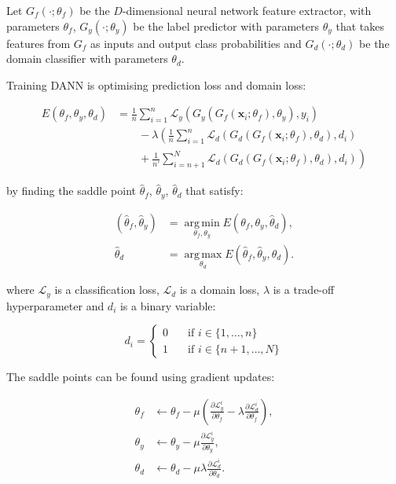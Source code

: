 Let \(G_f(\cdot; \theta_f)\) be the \(D\)-dimensional neural network feature extractor, with parameters \(\theta_f\),
\(G_y(\cdot; \theta_y)\) be the label predictor with parameters \(\theta_y\)
that takes features from \(G_f\) as inputs and output class probabilities
and \(G_d(\cdot; \theta_d)\) be the domain classifier with parameters \(\theta_d\).

Training DANN is optimising prediction loss and domain loss:

\begin{align}
	E(\theta_f, \theta_y, \theta_d) &= \frac{1}{n} \sum^{n}_{i = 1} \mathcal{L}_y(G_y(G_f(\mathbf{x}_i; \theta_f), \theta_y), y_i) \nonumber \\
	&\qquad {} - \lambda \left(\frac{1}{n} \sum^{n}_{i = 1} \mathcal{L}_d(G_d(G_f(\mathbf{x}_i; \theta_f), \theta_d), d_i) \right. \nonumber \\
	&\qquad \left. {} + \frac{1}{n'} \sum^{N}_{i = n + 1} \mathcal{L}_d(G_d(G_f(\mathbf{x}_i; \theta_f), \theta_d), d_i)\right)
\end{align}

by finding the saddle point \(\hat{\theta}_f\), \(\hat{\theta}_y\), \(\hat{\theta}_d\) that satisfy:

\begin{align}
	(\hat{\theta}_f, \hat{\theta}_y)
	&= \operatorname*{arg\,min}_{\theta_f, \theta_y} E(\theta_f, \theta_y, \hat{\theta}_d),\\
	\hat{\theta}_d
	&= \operatorname*{arg\,max}_{\theta_d} E(\hat{\theta}_f, \hat{\theta}_y, \theta_d).
\end{align}

where \(\mathcal{L}_y\) is a classification loss,
\(\mathcal{L}_d\) is a domain loss,
\(\lambda\) is a trade-off hyperparameter
and \(d_i\) is a binary variable:

\begin{equation}
	d_i =
	\begin{cases}
		0 & \quad \text{if } i \in \{1, \dots, n\} \\
		1 & \quad \text{if } i \in \{n + 1, \dots, N\}
	\end{cases}
\end{equation}

The saddle points can be found using gradient updates:

\begin{align}
	\theta_f &\gets \theta_f - \mu \left(
	\frac{\partial \mathcal{L}_y^i}{\partial \theta_f}
	- \lambda \frac{\partial \mathcal{L}_d^i}{\partial \theta_f}
	\right),
	\label{feature_parameters_update} \\
	\theta_y &\gets \theta_y - \mu
	\frac{\partial \mathcal{L}_y^i}{\partial \theta_y}, \\
	\theta_d &\gets \theta_d - \mu \lambda
	\frac{\partial \mathcal{L}_d^i}{\partial \theta_d}.
\end{align}


